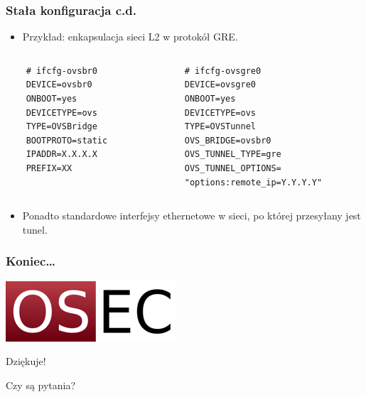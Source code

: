 \documentclass[dvipsnames,table]{beamer}
\begin{document}
\begin{frame}[fragile]
\frametitle{Stała konfiguracja c.d.}
\begin{itemize}
	\item Przykład: enkapsulacja sieci L2 w protokół GRE.
\end{itemize}
\begin{columns}
	\begin{column}{0.5\textwidth}
		\begin{verbatim}
	# ifcfg-ovsbr0
	DEVICE=ovsbr0
	ONBOOT=yes
	DEVICETYPE=ovs
	TYPE=OVSBridge
	BOOTPROTO=static
	IPADDR=X.X.X.X
	PREFIX=XX
		\end{verbatim}
	\end{column}
	\begin{column}{0.5\textwidth}
		\begin{verbatim}
	# ifcfg-ovsgre0
	DEVICE=ovsgre0
	ONBOOT=yes
	DEVICETYPE=ovs
	TYPE=OVSTunnel
	OVS_BRIDGE=ovsbr0
	OVS_TUNNEL_TYPE=gre
	OVS_TUNNEL_OPTIONS=
	"options:remote_ip=Y.Y.Y.Y"
		\end{verbatim}
	\end{column}
\end{columns}
\begin{itemize}
	\item Ponadto standardowe interfejsy ethernetowe w sieci, po której przesyłany jest tunel.
\end{itemize}
\end{frame}

\begin{frame}
\frametitle{Koniec\ldots}
\begin{center}
\includegraphics[scale=0.5]{img-oseclogo.png}

Dziękuje!

Czy są pytania?

\end{center}
\end{frame}
\end{document}
